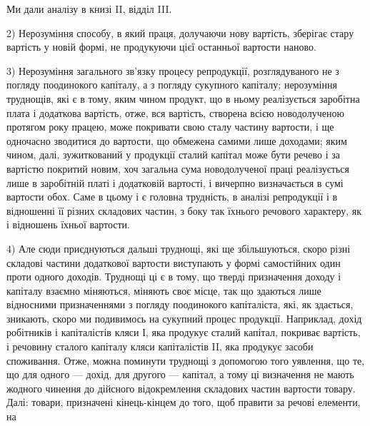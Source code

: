 Ми дали аналізу в книзі II, відділ III.

2) Нерозуміння способу, в який праця, долучаючи нову вартість, зберігає
стару вартість у новій формі, не продукуючи цієї останньої вартости наново.

3) Нерозуміння загального зв’язку процесу репродукції, розглядуваного не
з погляду поодинокого капіталу, а з погляду сукупного капіталу; нерозуміння
труднощів, які є в тому, яким чином продукт, що в ньому реалізується заробітна
плата і додаткова вартість, отже, вся вартість, створена всією новодолученою
протягом року працею, може покривати свою сталу частину вартости, і ще одночасно
зводитися до вартости, що обмежена самими лише доходами; яким чином,
далі, зужиткований у продукції сталий капітал може бути речево і за
вартістю покритий новим, хоч загальна сума новодолученої праці реалізується
лише в заробітній платі і додатковій вартості, і вичерпно визначається в сумі
вартости обох. Саме в цьому і є головна трудність, в аналізі репродукції і в відношенні
її різних складових частин, з боку так їхнього речового характеру, як
і відношень їхньої вартости.

4) Але сюди приєднуються дальші труднощі, які ще збільшуються, скоро
різні складові частини додаткової вартости виступають у формі самостійних один
проти одного доходів. Труднощі ці є в тому, що тверді призначення доходу і
капіталу взаємно міняються, міняють своє місце, так що здаються лише відносними
призначеннями з погляду поодинокого капіталіста, які, як здається, зникають,
скоро ми подивимось на сукупний процес продукції. Наприклад, дохід
робітників і капіталістів кляси І, яка продукує сталий капітал, покриває вартість,
і речовину сталого капіталу кляси капіталістів II, яка продукує засоби споживання.
Отже, можна поминути труднощі з допомогою того уявлення, що те, що
для одного — дохід, для другого — капітал, а тому ці визначення не мають жодного
чинення до дійсного відокремлення складових частин вартости товару. Далі:
товари, призначені кінець-кінцем до того, щоб правити за речові елементи, на
\parbreak{}  %
